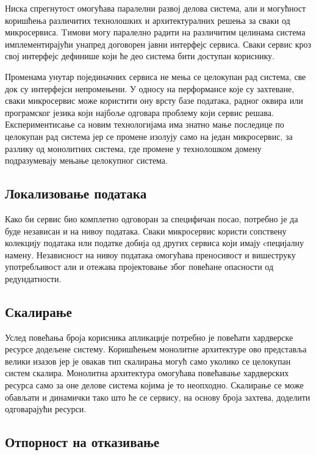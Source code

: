 \documentclass[12pt,oneside]{memoir}
\begin{document}
Ниска спрегнутост омогућава паралелни развој делова система, али и могућност коришћења различитих технолошких и архитектуралних решења за сваки од микросервиса. Tимови могу паралелно радити на различитим целинама система имплементирајући унапред договорен јавни интерфејс сервиса. Сваки сервис кроз свој интерфејс дефинише који ће део система бити доступан кориснику.

Променама унутар појединачних сервиса не мења се целокупан рад система, све док су интерфејси непромењени. У односу на перформансе које су захтеване, сваки микросервис може користити ону врсту базе података, радног оквира или програмског језика који најбоље одговара проблему који сервис решава. Експериментисање са новим технологијама има знатно мање последице по целокупан рад система јер се промене изолују само на један микросервис, за разлику од монолитних система, где промене у технолошком домену подразумевају мењање целокупног система.


\subsection{Локализовање података}

Како би сервис био комплетно одговоран за специфичан посао, потребно је да буде независан и на нивоу података. Сваки микросервис користи сопствену колекцију података или податке добија од других сервиса који имају cпецијалну намену. Независност на нивоу података омогућава преносивост и вишеструку употребљивост али и отежава пројектовање због повећане опасности од редундатности.


\subsection{Скалирање}

Услед повећања броја корисника апликације потребно је повећати хардверске ресурсе додељене систему. Коришћењем монолитне архитектуре ово представља велики изазов јер је овакав тип скалирања могућ само уколико се целокупан систем скалира. Монолитна архитектура омогућава повећавање хардверских ресурса само за оне делове система којима је то неопходно. Скалирање се може обављати и динамички тако што ће се сервису, на основу броја захтева, доделити одговарајући ресурси.


\subsection{Отпорност на отказивање}
\end{document}
